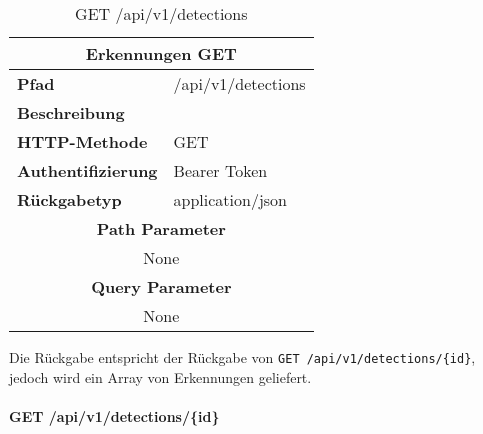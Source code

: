 \begin{table}[H]
  \centering
  \begin{tabular}{|l|l|}
  \hline
  \multicolumn{2}{|c|}{\textbf{Erkennungen GET}} \\ \hline
  \textbf{Pfad}                & /api/v1/detections  \\ \hline
  \textbf{Beschreibung}        &                     \\ \hline
  \textbf{HTTP-Methode}        & GET                 \\ \hline
  \textbf{Authentifizierung}   & Bearer Token        \\ \hline
  \textbf{Rückgabetyp}         & application/json    \\ \hline
  \multicolumn{2}{|c|}{\textbf{Path Parameter}}                      \\ \hline
  \multicolumn{2}{|c|}{None}          \\ \hline
  \multicolumn{2}{|c|}{\textbf{Query Parameter}}                      \\ \hline
  \multicolumn{2}{|c|}{None}          \\ \hline
  \end{tabular}
  \caption{GET /api/v1/detections}
\end{table}

Die Rückgabe entspricht der Rückgabe von \verb|GET /api/v1/detections/{id}|, jedoch wird ein
Array von Erkennungen geliefert.

\paragraph{GET /api/v1/detections/\{id\}}\mbox{}\\

